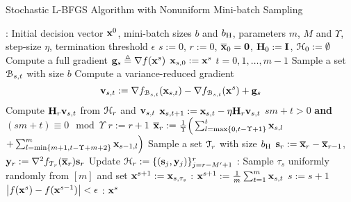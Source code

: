 \documentclass[10pt,twocolumn,journal]{IEEEtran}
\begin{document}
\begin{algorithm}[t]
\caption{Stochastic L-BFGS Algorithm with Nonuniform Mini-batch Sampling} \label{algo:SLBFGS-nonuniform}
\begin{algorithmic}[1]
: Initial decision vector $\mathbf{x}^0$,  mini-batch sizes $b$ and $b_{\mathrm{H}}$, parameters $m$, $M$ and $\Upsilon$, step-size $\eta$, termination threshold $\epsilon$
 $s:=0$, $r:=0$, $\overline{\bf x}_0=\mathbf{0}$, $\mathbf{H}_0:=\mathbf{I}$, $\mathcal{H}_0:=\emptyset$
\State \quad Compute a full gradient $\mathbf{g}_s \triangleq\nabla f(\mathbf{x}^s)$
\State \quad $\mathbf{x}_{s,0}:=\mathbf{x}^s$
\State {} $t=0,1,\ldots,m-1$
\State \quad\quad Sample a set $\mathcal{B}_{s,t}$ with size $b$ %
\State \quad\quad Compute a variance-reduced gradient 
\begin{equation}
\mathbf{v}_{s,t}:=\nabla f_{\mathcal{B}_{s,t}}(\mathbf{x}_{s,t}) - \nabla f_{\mathcal{B}_{s,t}}(\mathbf{x}^{s})+ \mathbf{g}_s\label{eq:var_reduced_grad}
\end{equation}
\State \quad \quad Compute $\mathbf{H}_r\mathbf{v}_{s,t}$ from $\mathcal{H}_r$ and $\mathbf{v}_{s,t}$\label{line:two_loop} %
\State \quad\quad $\mathbf{x}_{s,t+1}:= \mathbf{x}_{s,t}-\eta\mathbf{H}_r\mathbf{v}_{s,t}$ \label{line:iteration}
\State \quad {} $sm+t>0$ {\bf and} $(sm+t)\equiv0\mod \Upsilon$ 
\State \quad \quad\quad $r:=r+1$
\State \quad \quad\quad $\overline{\bf x}_r:=\frac{1}{\Upsilon}\Big(\sum_{l=\max\{0,t-\Upsilon+1\}}^t \mathbf{x}_{s,l}$\label{line:barx}
\Statex \hspace{3cm} $+\sum_{l=\min\{m+1,t-\Upsilon+m+2\}}^m \mathbf{x}_{s-1,l}\Big)$ 
\State \quad \quad\quad Sample a set $\mathcal{T}_r$ with size $b_{\mathrm{H}}$ %
\State \quad \quad\quad $\mathbf{s}_r:=\overline{\bf x}_{r}-\overline{\bf x}_{r-1}$, $\mathbf{y}_r := \nabla^2 f_{\mathcal{T}_r}(\overline{\bf x}_r)\mathbf{s}_r$\label{line:correction_pair}
\State \quad \quad\quad Update $\mathcal{H}_r:= \{(\mathbf{s}_j,\mathbf{y}_j)\}_{j=r-M'+1}^r$
\State \quad{}
\State {}
\State {}: Sample $\tau_s$ uniformly randomly from $[m]$ and set $\mathbf{x}^{s+1}:=\mathbf{x}_{s,\tau_s}$\label{line:sample_tau_s}   %
\State {}: $\mathbf{x}^{s+1}:= \frac{1}{m}\sum_{t=1}^m\mathbf{x}_{s,t}$ \label{line:uniform_ave}
\State \quad $s:=s+1$
 $\left\lvert f(\mathbf{x}^s)-f(\mathbf{x}^{s-1})\right\rvert < \epsilon$ %
: $\mathbf{x}^s$
\end{algorithmic}
\end{algorithm}
\end{document}
